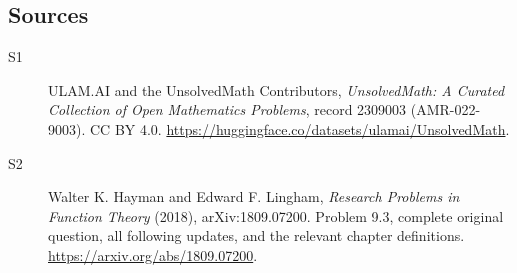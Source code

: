 \documentclass[11pt]{book}
\begin{document}
\subsection{Sources}
\begin{description}
\item[\hypertarget{source:2309003:1}{S1}] ULAM.AI and the UnsolvedMath Contributors, \emph{UnsolvedMath: A Curated Collection of Open Mathematics Problems}, record 2309003 (AMR-022-9003). CC BY 4.0. \url{https://huggingface.co/datasets/ulamai/UnsolvedMath}.
\item[\hypertarget{source:2309003:2}{S2}] Walter K. Hayman and Edward F. Lingham, \emph{Research Problems in Function Theory} (2018), arXiv:1809.07200. Problem 9.3, complete original question, all following updates, and the relevant chapter definitions. \url{https://arxiv.org/abs/1809.07200}.
\end{description}
\label{end:2309003}
\end{document}
